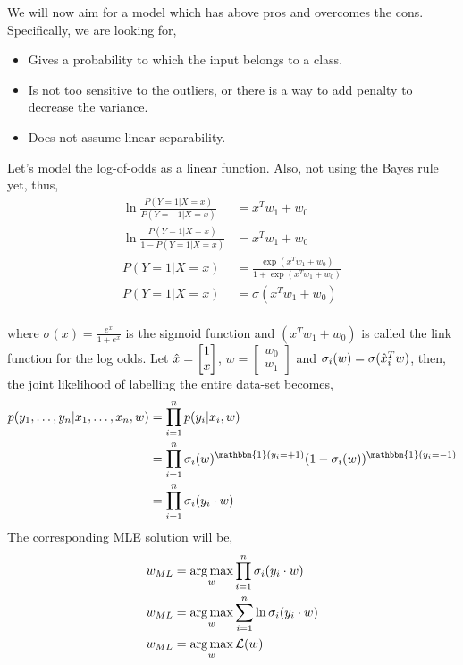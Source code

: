 \documentclass{article}
\begin{document}
We will now aim for a model which has above pros and overcomes the cons. Specifically, we are looking for,
\begin{itemize}
    \item Gives a probability to which the input belongs to a class.
    \item Is not too sensitive to the outliers, or there is a way to add penalty to decrease the variance.
    \item Does not assume linear separability.
\end{itemize}

Let's model the log-of-odds as a linear function. Also, not using the Bayes rule yet, thus,
\begin{align*}
    \ln{\frac{P(Y=1|X=x)}{P(Y=-1|X=x)}} &= x^Tw_1+w_0\\
    \ln{\frac{P(Y=1|X=x)}{1-P(Y=1|X=x)}} &= x^Tw_1+w_0\\
    P(Y=1|X=x) &= \frac{\exp{(x^Tw_1+w_0)}}{1+\exp{(x^Tw_1+w_0)}}\\
    P(Y=1|X=x) &= \sigma(x^Tw_1+w_0)\\
\end{align*}

where $\sigma(x) = \frac{e^x}{1+e^x}$ is the sigmoid function and $(x^Tw_1+w_0)$ is called the link function for the log odds.
\newpara
Let $\hat{x} = \begin{bmatrix}1\\x\end{bmatrix}$, $w = \begin{bmatrix}w_0\\w_1\end{bmatrix}$ and $\sigma_i(w) = \sigma(\hat{x}_i^Tw)$, then, the joint likelihood of labelling the entire data-set becomes,
\begin{align*}
    p(y_1,\dots,y_n | x_1, \dots, x_n, w) &= \prod_{i=1}^n p(y_i|x_i,w)\\
    &= \prod_{i=1}^n \sigma_i(w)^{\mathbbm{1}(y_i = +1)} (1-\sigma_i(w))^{\mathbbm{1}(y_i = -1)} \\
    &= \prod_{i=1}^n \sigma_i(y_i\cdot w) \\
\end{align*}
The corresponding MLE solution will be,
\begin{align*}
    w_{ML} & = \operatorname*{arg\,max}_w \prod_{i=1}^n \sigma_i(y_i\cdot w) \\
    w_{ML} & = \operatorname*{arg\,max}_w \sum_{i=1}^n{\ln{\sigma_i(y_i\cdot w)} }\\
    w_{ML} & = \operatorname*{arg\,max}_w \mathcal{L}(w) 
\end{align*}
\end{document}
